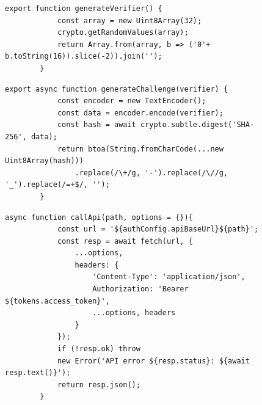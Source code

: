\begin{figure}[H]
    \begin{lstlisting}[caption=PKCE-Verifier-Generierung, breaklines = true, label=list:pkceverifier]
        export function generateVerifier() {
            const array = new Uint8Array(32);	
            crypto.getRandomValues(array);
            return Array.from(array, b => ('0'+ b.toString(16)).slice(-2)).join('');
        }
    \end{lstlisting}
\end{figure}

\begin{figure}[H]
    \begin{lstlisting}[caption=PKCE-Challenge-Generierung, breaklines = true, label=list:pkcechallenge]
        export async function generateChallenge(verifier) {
            const encoder = new TextEncoder();
            const data = encoder.encode(verifier);
            const hash = await crypto.subtle.digest('SHA-256', data);
            return btoa(String.fromCharCode(...new Uint8Array(hash)))
                .replace(/\+/g, '-').replace(/\//g, '_').replace(/=+$/, '');
        }
    \end{lstlisting}
\end{figure}

\begin{figure}[H]
    \begin{lstlisting}[caption=PKCE-Challenge-Generierung, breaklines = true, label=list:callApi]
        async function callApi(path, options = {}){
            const url = '${authConfig.apiBaseUrl}${path}';
            const resp = await fetch(url, {
                ...options,
                headers: {
                    'Content-Type': 'application/json',
                    Authorization: 'Bearer ${tokens.access_token}',
                    ...options, headers
                }
            });
            if (!resp.ok) throw 
            new Error('API error ${resp.status}: ${await resp.text()}');
            return resp.json();
        }
    \end{lstlisting}
\end{figure}